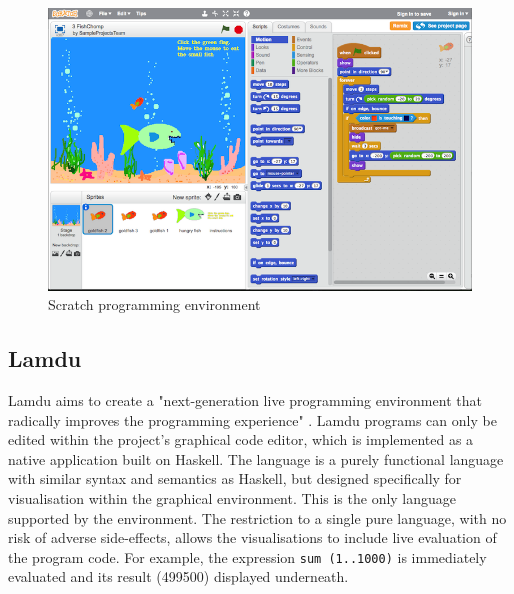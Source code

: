 \begin{figure}[H]
\centering
\includegraphics[scale=0.5]{graphics/scratch-editor} %
\caption{Scratch programming environment}
\label{fig:scratch} %
\end{figure}

\subsection{Lamdu}

Lamdu aims to create a "next-generation live programming environment that radically improves the programming experience" \cite{lamdu}. Lamdu programs can only be edited within the project's graphical code editor, which is implemented as a native application built on Haskell. The language is a purely functional language with similar syntax and semantics as Haskell, but designed specifically for visualisation within the graphical environment. This is the only language supported by the environment. The restriction to a single pure language, with no risk of adverse side-effects, allows the visualisations to include live evaluation of the program code. For example, the expression \verb+sum (1..1000)+ is immediately evaluated and its result (499500) displayed underneath.

